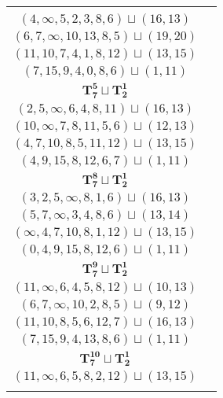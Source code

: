 \documentclass{article}
\begin{document}
\begin{longtable}{|c|c|}
\begin{tabular}{c}
        $(1,2,4,5,8,0,\infty)\sqcup(11,13)$ \\ 
        $(4,\infty,5,2,3,8,6)\sqcup(16,13)$ \\ 
        $(6,7,\infty,10,13,8,5)\sqcup(19,20)$ \\ 
        $(11,10,7,4,1,8,12)\sqcup(13,15)$ \\ 
        $(7,15,9,4,0,8,6)\sqcup(1,11)$
        \end{tabular} \\ 
        \hline
        $\mathbf{T_{7}^{5}} \sqcup \mathbf{T_{2}^{1}}$ & \begin{tabular}{c}
        $(5,4,2,3,6,0,1)\sqcup(9,\infty)$ \\ 
        $(2,5,\infty,6,4,8,11)\sqcup(16,13)$ \\ 
        $(10,\infty,7,8,11,5,6)\sqcup(12,13)$ \\ 
        $(4,7,10,8,5,11,12)\sqcup(13,15)$ \\ 
        $(4,9,15,8,12,6,7)\sqcup(1,11)$
        \end{tabular} \\ 
        \hline
        $\mathbf{T_{7}^{8}} \sqcup \mathbf{T_{2}^{1}}$ & \begin{tabular}{c}
        $(8,5,4,2,0,6,\infty)\sqcup(11,13)$ \\ 
        $(3,2,5,\infty,8,1,6)\sqcup(16,13)$ \\ 
        $(5,7,\infty,3,4,8,6)\sqcup(13,14)$ \\ 
        $(\infty,4,7,10,8,1,12)\sqcup(13,15)$ \\ 
        $(0,4,9,15,8,12,6)\sqcup(1,11)$
        \end{tabular} \\ 
        \hline
        $\mathbf{T_{7}^{9}} \sqcup \mathbf{T_{2}^{1}}$ & \begin{tabular}{c}
        $(1,2,4,5,7,0,3)\sqcup(8,11)$ \\ 
        $(11,\infty,6,4,5,8,12)\sqcup(10,13)$ \\ 
        $(6,7,\infty,10,2,8,5)\sqcup(9,12)$ \\ 
        $(11,10,8,5,6,12,7)\sqcup(16,13)$ \\ 
        $(7,15,9,4,13,8,6)\sqcup(1,11)$
        \end{tabular} \\ 
        \hline
        $\mathbf{T_{7}^{10}} \sqcup \mathbf{T_{2}^{1}}$ & \begin{tabular}{c}
        $(1,2,4,6,0,3,5)\sqcup(8,11)$ \\ 
        $(11,\infty,6,5,8,2,12)\sqcup(13,15)$ \\ 

\end{tabular}
\end{longtable}
\end{document}
